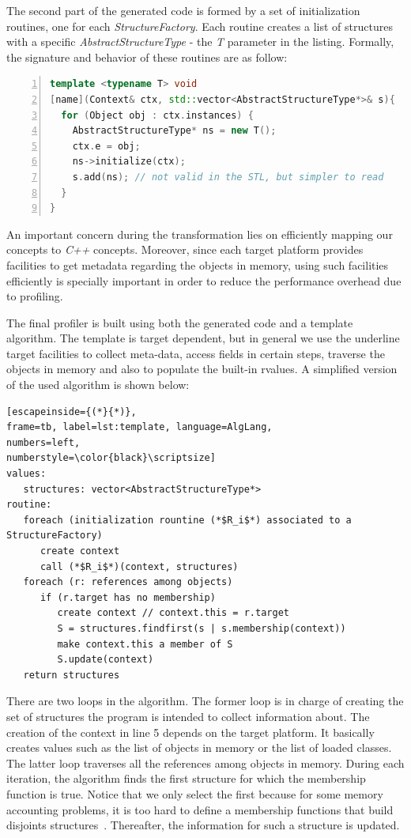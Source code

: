 The second part of the generated code is formed by a set of initialization routines, one for each \textit{StructureFactory}.
Each routine creates a list of structures with a specific \textit{AbstractStructureType} - the \textit{T} parameter in the listing.
Formally, the signature and behavior of these routines are as follow:
\begin{lstlisting}[language=C++, frame=none,
numbers=left,
numberstyle=\color{black}\scriptsize,]
template <typename T> void
[name](Context& ctx, std::vector<AbstractStructureType*>& s){
  for (Object obj : ctx.instances) {
    AbstractStructureType* ns = new T();
    ctx.e = obj;
    ns->initialize(ctx);
    s.add(ns); // not valid in the STL, but simpler to read
  }
}
\end{lstlisting}
An important concern during the transformation lies on efficiently mapping our concepts to \textit{C++} concepts.
Moreover, since each target platform provides facilities to get metadata regarding the objects in memory, using such facilities efficiently is specially important in order to reduce the performance overhead due to profiling.

The final profiler is built using both the generated code and a template algorithm.
The template is target dependent, but in general we use the underline target facilities to collect meta-data, access fields in certain steps, traverse the objects in memory and also to populate the built-in rvalues.
A simplified version of the used algorithm is shown below:
\begin{lstlisting}[escapeinside={(*}{*)},
frame=tb, label=lst:template, language=AlgLang,
numbers=left,
numberstyle=\color{black}\scriptsize]
values:
   structures: vector<AbstractStructureType*>
routine:
   foreach (initialization rountine (*$R_i$*) associated to a StructureFactory)
      create context
	  call (*$R_i$*)(context, structures)
   foreach (r: references among objects)
      if (r.target has no membership)
         create context // context.this = r.target
         S = structures.findfirst(s | s.membership(context))
         make context.this a member of S
         S.update(context)
   return structures 
\end{lstlisting}
There are two loops in the algorithm. 
The former loop is in charge of creating the set of structures the program is intended to collect information about.
The creation of the context in line 5 depends on the target platform.
It basically creates values such as the list of objects in memory or the list of loaded classes.
The latter loop traverses all the references among objects in memory.
During each iteration, the algorithm finds the first structure for which the membership function is true.
Notice that we only select the first because for some memory accounting problems, it is too hard to define a membership functions that build disjoints structures~\cite{dsn/09/geoffray/ijvm, cbse/14/attouchi/monitoring}.
Thereafter, the information for such a structure is updated.


